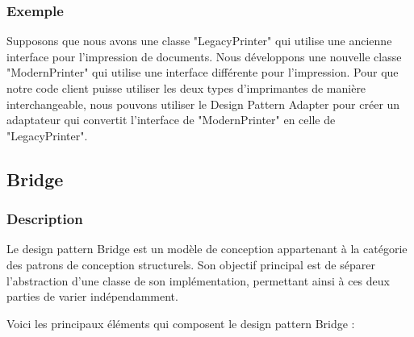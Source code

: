 \documentclass[french]{article}
\begin{document}
\subsubsection{Exemple}

Supposons que nous avons une classe "LegacyPrinter" qui utilise une ancienne interface pour l'impression de documents. Nous développons une nouvelle classe "ModernPrinter" qui utilise une interface différente pour l'impression. Pour que notre code client puisse utiliser les deux types d'imprimantes de manière interchangeable, nous pouvons utiliser le Design Pattern Adapter pour créer un adaptateur qui convertit l'interface de "ModernPrinter" en celle de "LegacyPrinter".




\newpage

\subsection{Bridge}

\subsubsection{Description}

Le design pattern Bridge est un modèle de conception appartenant à la catégorie des patrons de conception structurels. Son objectif principal est de séparer l'abstraction d'une classe de son implémentation, permettant ainsi à ces deux parties de varier indépendamment.

Voici les principaux éléments qui composent le design pattern Bridge :
\end{document}

